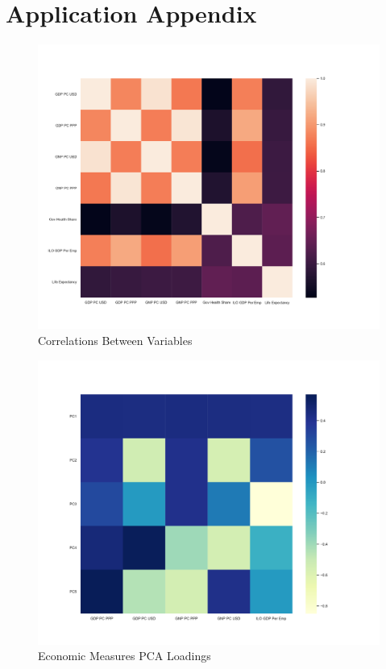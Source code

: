 \documentclass[10pt]{article}
\begin{document}
\clearpage

    \section*{Application Appendix}

        \begin{figure}[H]
            \centering
            \caption{Correlations Between Variables}
            \label{LE_Health_Econ_Correlations}	
            \includegraphics[width=\linewidth,keepaspectratio=true]{../Output/Figures/LE_Health_Econ_Correlations_wb_only_short.pdf}
        \end{figure}

        \begin{figure}[H]
            \centering
            \caption{Economic Measures PCA Loadings}
            \label{Econ_Loadings}	
            \includegraphics[width=\linewidth,keepaspectratio=true]{../Output/Figures/Econ_Indicator_Loadings_wb_only_short.pdf}
        \end{figure}
\end{document}
